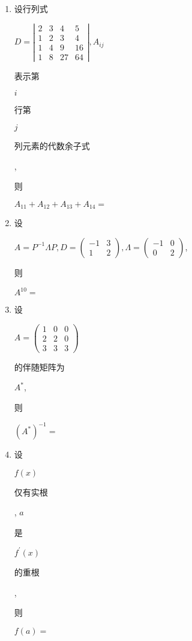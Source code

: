 \documentclass[10pt]{article}
\begin{document}
\begin{enumerate}
  \item \begin{CJK}{UTF8}{mj}设行列式\end{CJK} $D=\left|\begin{array}{cccc}2 & 3 & 4 & 5 \\ 1 & 2 & 3 & 4 \\ 1 & 4 & 9 & 16 \\ 1 & 8 & 27 & 64\end{array}\right|, A_{i j}$ \begin{CJK}{UTF8}{mj}表示第\end{CJK} $i$ \begin{CJK}{UTF8}{mj}行第\end{CJK} $j$ \begin{CJK}{UTF8}{mj}列元素的代数余子式\end{CJK}, \begin{CJK}{UTF8}{mj}则\end{CJK} $A_{11}+A_{12}+A_{13}+A_{14}=$

  \item \begin{CJK}{UTF8}{mj}设\end{CJK} $A=P^{-1} \Lambda P, D=\left(\begin{array}{cc}-1 & 3 \\ 1 & 2\end{array}\right), \Lambda=\left(\begin{array}{cc}-1 & 0 \\ 0 & 2\end{array}\right)$, \begin{CJK}{UTF8}{mj}则\end{CJK} $A^{10}=$

  \item \begin{CJK}{UTF8}{mj}设\end{CJK} $A=\left(\begin{array}{lll}1 & 0 & 0 \\ 2 & 2 & 0 \\ 3 & 3 & 3\end{array}\right)$ \begin{CJK}{UTF8}{mj}的伴随矩阵为\end{CJK} $A^{*}$, \begin{CJK}{UTF8}{mj}则\end{CJK} $\left(A^{*}\right)^{-1}=$

  \item \begin{CJK}{UTF8}{mj}设\end{CJK} $f(x)$ \begin{CJK}{UTF8}{mj}仅有实根\end{CJK}, $a$ \begin{CJK}{UTF8}{mj}是\end{CJK} $f^{\prime}(x)$ \begin{CJK}{UTF8}{mj}的重根\end{CJK}, \begin{CJK}{UTF8}{mj}则\end{CJK} $f(a)=$


\end{enumerate}
\end{document}
